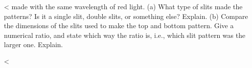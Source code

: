 <%
made with the same wavelength of red light. (a) What type of
slits made the patterns? Is it a single slit, double slits,
or something else? Explain. (b) Compare the dimensions of
the slits used to make the top and bottom pattern. Give a
numerical ratio, and state which way the ratio is, i.e.,
which slit pattern was the larger one. Explain.

<%
